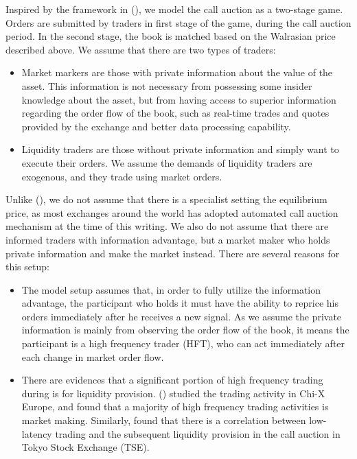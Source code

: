 \documentclass{article}
\begin{document}
Inspired by the framework in (\cite{Madhavan2015}), we model the call auction as a two-stage game. Orders are submitted by traders in first stage of the game, during the call auction period. In the second stage, the book is matched based on the Walrasian price described above. We assume that there are two types of traders:

\begin{itemize}
  \item Market markers are those with private information about the value of the asset. This information is not necessary from possessing some insider knowledge about the asset, but from having access to superior information regarding the order flow of the book, such as real-time trades and quotes provided by the exchange and better data processing capability.
  \item Liquidity traders are those without private information and simply want to execute their orders. We assume the demands of liquidity traders are exogenous, and they trade using market orders.
\end{itemize}

Unlike (\cite{Madhavan2015}), we do not assume that there is a specialist setting the equilibrium price, as most exchanges around the world has adopted automated call auction mechanism at the time of this writing. We also do not assume that there are informed traders with information advantage, but a market maker who holds private information and make the market instead. There are several reasons for this setup:
\begin{itemize}
  \item The model setup assumes that, in order to fully utilize the information advantage, the participant who holds it must have the ability to reprice his orders immediately after he receives a new signal. As we assume the private information is mainly from observing the order flow of the book, it means the participant is a high frequency trader (HFT), who can act immediately after each change in market order flow.
  \item There are evidences that a significant portion of high frequency trading during is for liquidity provision. (\cite{Menkveld2013}) studied the trading activity in Chi-X Europe, and found that a majority of high frequency trading activities is market making. Similarly, \cite{Bellia2017} found that there is a correlation between low-latency trading and the subsequent liquidity provision in the call auction in Tokyo Stock Exchange (TSE).
\end{itemize}
\end{document}
